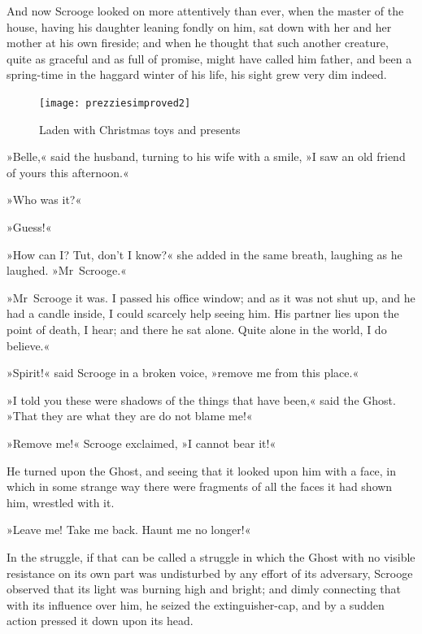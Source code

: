 And now Scrooge looked on more attentively than ever, when the master of the house, having his daughter leaning fondly on him, sat down with her and her mother at his own fireside; and when he thought that such another creature, quite as graceful and as full of promise, might have called him father, and been a spring-time in the haggard winter of his life, his sight grew very dim indeed.

\begin{figure}[p!]
\begin{minipage}[c]{\textwidth}
\texttt{[image: prezziesimproved2]}
\caption[\textbf{Laden with Christmas toys and presents}]{Laden with Christmas toys and presents}
\end{minipage}
\end{figure}

»Belle,« said the husband, turning to his wife with a smile, »I saw an old friend of yours this afternoon.«

»Who was it?«

»Guess!«

»How can I? Tut, don't I know?« she added in the same breath, laughing as he laughed. »Mr~Scrooge.«


»Mr~Scrooge it was. I passed his office window; and as it was not shut up, and he had a candle inside, I could scarcely help seeing him. His partner lies upon the point of death, I hear; and there he sat alone. Quite alone in the world, I do believe.«

»Spirit!« said Scrooge in a broken voice, »remove me from this place.«

»I told you these were shadows of the things that have been,« said the Ghost. »That they are what they are do not blame me!«

»Remove me!« Scrooge exclaimed, »I cannot bear it!«

He turned upon the Ghost, and seeing that it looked upon him with a face, in which in some strange way there were fragments of all the faces it had shown him, wrestled with it.

»Leave me! Take me back. Haunt me no longer!«

In the struggle, if that can be called a struggle in which the Ghost with no visible resistance on its own part was undisturbed by any effort of its adversary, Scrooge observed that its light was burning high and bright; and dimly connecting that with its influence over him, he seized the extinguisher-cap, and by a sudden action pressed it down upon its head.

